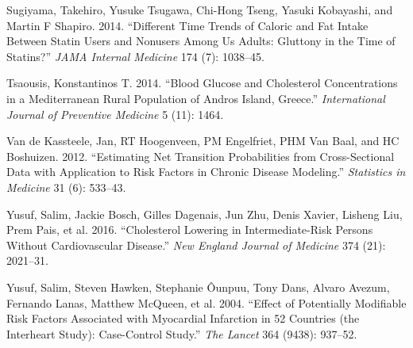 \documentclass[
  12pt,
]{article}
\begin{document}
\leavevmode\hypertarget{ref-sugiyama2014}{}%
Sugiyama, Takehiro, Yusuke Tsugawa, Chi-Hong Tseng, Yasuki Kobayashi, and Martin F Shapiro. 2014. ``Different Time Trends of Caloric and Fat Intake Between Statin Users and Nonusers Among Us Adults: Gluttony in the Time of Statins?'' \emph{JAMA Internal Medicine} 174 (7): 1038--45.

\leavevmode\hypertarget{ref-tsaousis2014}{}%
Tsaousis, Konstantinos T. 2014. ``Blood Glucose and Cholesterol Concentrations in a Mediterranean Rural Population of Andros Island, Greece.'' \emph{International Journal of Preventive Medicine} 5 (11): 1464.

\leavevmode\hypertarget{ref-van2012estimating}{}%
Van de Kassteele, Jan, RT Hoogenveen, PM Engelfriet, PHM Van Baal, and HC Boshuizen. 2012. ``Estimating Net Transition Probabilities from Cross-Sectional Data with Application to Risk Factors in Chronic Disease Modeling.'' \emph{Statistics in Medicine} 31 (6): 533--43.

\leavevmode\hypertarget{ref-yusuf2016}{}%
Yusuf, Salim, Jackie Bosch, Gilles Dagenais, Jun Zhu, Denis Xavier, Lisheng Liu, Prem Pais, et al. 2016. ``Cholesterol Lowering in Intermediate-Risk Persons Without Cardiovascular Disease.'' \emph{New England Journal of Medicine} 374 (21): 2021--31.

\leavevmode\hypertarget{ref-yusuf2004effect}{}%
Yusuf, Salim, Steven Hawken, Stephanie Ôunpuu, Tony Dans, Alvaro Avezum, Fernando Lanas, Matthew McQueen, et al. 2004. ``Effect of Potentially Modifiable Risk Factors Associated with Myocardial Infarction in 52 Countries (the Interheart Study): Case-Control Study.'' \emph{The Lancet} 364 (9438): 937--52.
\end{document}
